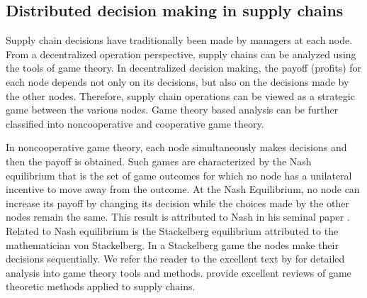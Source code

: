 \subsection*{Distributed decision making in supply chains}
Supply chain decisions have traditionally been made by managers at
each node. From a decentralized operation perspective, supply chains
can be analyzed using the tools of game theory.
In decentralized decision making, the payoff (profits) for each node
depends not only on its decisions, but also on the decisions made by
the other nodes. Therefore, supply chain
operations can be viewed as a strategic game between the various
nodes. Game theory based analysis can be further classified into
noncooperative and cooperative game theory.

In noncooperative game theory, each node simultaneously makes
decisions and then the payoff is obtained. Such games are
characterized by the Nash equilibrium that is the set of game
outcomes for which no node has a unilateral incentive to move away
from the outcome. At the Nash Equilibrium, no node can
increase its payoff by changing its decision while the
choices made by the other nodes remain the same. This result is
attributed to Nash in his seminal paper \citep{nash:1951}. Related to
Nash equilibrium is the Stackelberg equilibrium attributed to the
mathematician von Stackelberg. In a Stackelberg game the nodes 
make their decisions sequentially. We refer the reader to the
excellent text by \citet{ basar:olsder:1999} for detailed analysis into
game theory tools and
methods. \citet{leng:parlar:2005,cachon:netessine:2006} provide
excellent reviews of game theoretic methods applied to supply 
chains.


